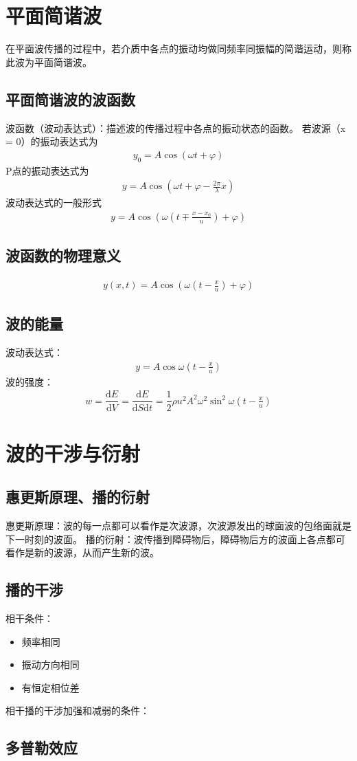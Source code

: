 \documentclass[12pt, a4paper, oneside]{ctexbook}
\begin{document}
\section{平面简谐波}
在平面波传播的过程中，若介质中各点的振动均做同频率同振幅的简谐运动，则称此波为平面简谐波。
\subsection{平面简谐波的波函数}
波函数（波动表达式）：描述波的传播过程中各点的振动状态的函数。
若波源（x = 0）的振动表达式为
\begin{align*}
    y_0 = A\cos{(\omega t + \varphi)}
\end{align*}
P点的振动表达式为
\begin{align*}
    y = A\cos{(\omega t + \varphi - \frac{2\pi}{\lambda}x)}
\end{align*}
波动表达式的一般形式
\begin{align*}
    y = A\cos{(\omega (t \mp \frac{x - x_0}{u}) + \varphi)}
\end{align*}

\subsection{波函数的物理意义}
\begin{align*}
    y(x,t) = A\cos{(\omega (t  - \frac{x}{u}) + \varphi)}
\end{align*}    
 
\subsection{波的能量}
波动表达式：
\begin{align*}
    y = A\cos{\omega( t - \frac{x}{u})}
\end{align*}
波的强度：
\begin{align*}
    w = \dfrac{\mathrm{d}E}{\mathrm{d}V} = \dfrac{\mathrm{d}E}{\mathrm{d}S\mathrm{d}t} = \dfrac{1}{2}\rho u^2 A^2 \omega^2 \sin^2{\omega(t - \frac{x}{u})}
\end{align*}

\section{波的干涉与衍射}
\subsection{惠更斯原理、播的衍射}
惠更斯原理：波的每一点都可以看作是次波源，次波源发出的球面波的包络面就是下一时刻的波面。
播的衍射：波传播到障碍物后，障碍物后方的波面上各点都可看作是新的波源，从而产生新的波。

\subsection{播的干涉}
相干条件：
\begin{itemize}
    \item 频率相同
    \item 振动方向相同
    \item 有恒定相位差
\end{itemize} 
相干播的干涉加强和减弱的条件：

\subsection{多普勒效应}
\end{document}
